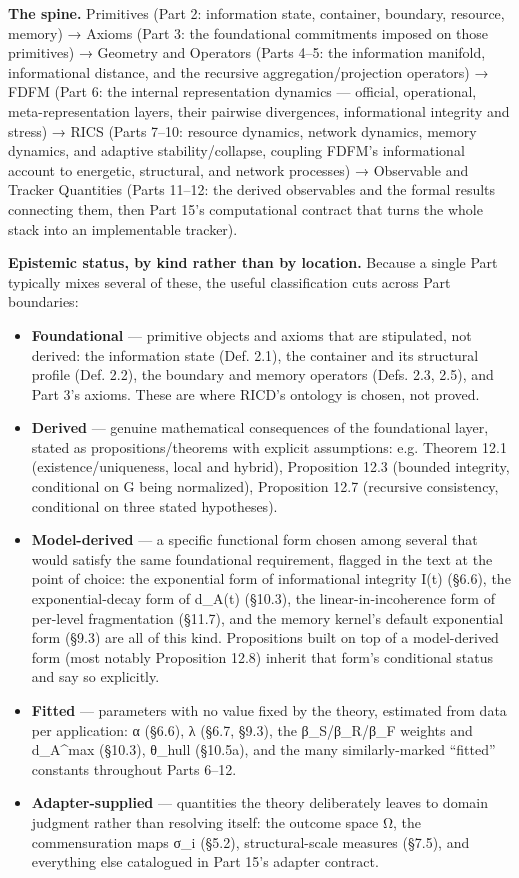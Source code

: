 \documentclass[
]{article}
\begin{document}
\textbf{The spine.} Primitives (Part 2: information state, container,
boundary, resource, memory) → Axioms (Part 3: the foundational
commitments imposed on those primitives) → Geometry and Operators (Parts
4--5: the information manifold, informational distance, and the
recursive aggregation/projection operators) → FDFM (Part 6: the internal
representation dynamics --- official, operational, meta-representation
layers, their pairwise divergences, informational integrity and stress)
→ RICS (Parts 7--10: resource dynamics, network dynamics, memory
dynamics, and adaptive stability/collapse, coupling FDFM's informational
account to energetic, structural, and network processes) → Observable
and Tracker Quantities (Parts 11--12: the derived observables and the
formal results connecting them, then Part 15's computational contract
that turns the whole stack into an implementable tracker).

\textbf{Epistemic status, by kind rather than by location.} Because a
single Part typically mixes several of these, the useful classification
cuts across Part boundaries:

\begin{itemize}
\item
  \textbf{Foundational} --- primitive objects and axioms that are
  stipulated, not derived: the information state (Def. 2.1), the
  container and its structural profile (Def. 2.2), the boundary and
  memory operators (Defs. 2.3, 2.5), and Part 3's axioms. These are
  where RICD's ontology is chosen, not proved.
\item
  \textbf{Derived} --- genuine mathematical consequences of the
  foundational layer, stated as propositions/theorems with explicit
  assumptions: e.g. Theorem 12.1 (existence/uniqueness, local and
  hybrid), Proposition 12.3 (bounded integrity, conditional on G being
  normalized), Proposition 12.7 (recursive consistency, conditional on
  three stated hypotheses).
\item
  \textbf{Model-derived} --- a specific functional form chosen among
  several that would satisfy the same foundational requirement, flagged
  in the text at the point of choice: the exponential form of
  informational integrity I(t) (§6.6), the exponential-decay form of
  d\_A(t) (§10.3), the linear-in-incoherence form of per-level
  fragmentation (§11.7), and the memory kernel's default exponential
  form (§9.3) are all of this kind. Propositions built on top of a
  model-derived form (most notably Proposition 12.8) inherit that form's
  conditional status and say so explicitly.
\item
  \textbf{Fitted} --- parameters with no value fixed by the theory,
  estimated from data per application: α (§6.6), λ (§6.7, §9.3), the
  β\_S/β\_R/β\_F weights and d\_A\^{}max (§10.3), θ\_hull (§10.5a), and
  the many similarly-marked ``fitted'' constants throughout Parts 6--12.
\item
  \textbf{Adapter-supplied} --- quantities the theory deliberately
  leaves to domain judgment rather than resolving itself: the outcome
  space Ω, the commensuration maps σ\_i (§5.2), structural-scale
  measures (§7.5), and everything else catalogued in Part 15's adapter
  contract.
\end{itemize}
\end{document}
